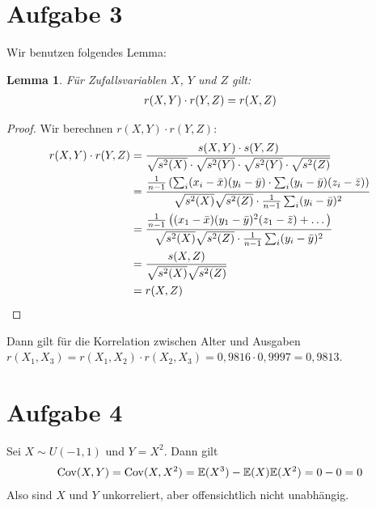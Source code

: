 \documentclass{article}
\newcommand{\E}{\mathbb{E}}
\DeclareMathOperator{\Cov}{Cov}
\renewcommand{\E}{\mathbb{E}}
\newtheorem{lem}{Lemma}
\begin{document}
	\section*{Aufgabe 3}
	Wir benutzen folgendes Lemma:
	\begin{lem}
		Für Zufallsvariablen $X$, $Y$ und $Z$ gilt:
		\begin{align}
			r(X,Y) \cdot r(Y,Z) = r(X,Z) \notag
		\end{align}
	\end{lem}
	\begin{proof}
		Wir berechnen $r(X,Y) \cdot r(Y,Z)$:
		\begin{align}
			r(X,Y) \cdot r(Y,Z) &= \frac{s(X,Y) \cdot s(Y,Z)}{\sqrt{s^2(X)} \cdot \sqrt{s^2(Y)} \cdot \sqrt{s^2(Y)} \cdot \sqrt{s^2(Z)}} \notag \\
			&=\frac{\frac{1}{n-1}\left(\sum_i (x_i-\bar{x})(y_i-\bar{y}) \cdot\sum_i (y_i-\bar{y})(z_i-\bar{z})\right)}{\sqrt{s^2(X)}\sqrt{s^2(Z)}\cdot\frac{1}{n-1}\sum_i (y_i-\bar{y})^2} \notag \\
			&= \frac{\frac{1}{n-1}\left((x_1-\bar{x})(y_1-\bar{y})^2(z_1-\bar{z}) + \dots\right)}{\sqrt{s^2(X)}\sqrt{s^2(Z)}\cdot\frac{1}{n-1}\sum_i (y_i-\bar{y})^2} \notag \\
			&= \frac{s(X,Z)}{\sqrt{s^2(X)}\sqrt{s^2(Z)}} \notag \\
			&= r(X,Z) \notag
		\end{align}
	\end{proof}
	Dann gilt für die Korrelation zwischen Alter und Ausgaben $r(X_1,X_3) = r(X_1,X_2)\cdot r(X_2,X_3) = 0,9816 \cdot 0,9997 = 0,9813$.

	\section*{Aufgabe 4}
	Sei $X\sim U(-1,1)$ und $Y=X^2$. Dann gilt
	\begin{align}
		\Cov(X,Y) = \Cov(X,X^2) = \E(X^3) - \E(X)\E(X^2) = 0-0=0 \notag
	\end{align}
	Also sind $X$ und $Y$ unkorreliert, aber offensichtlich nicht unabhängig.
	
\end{document}
